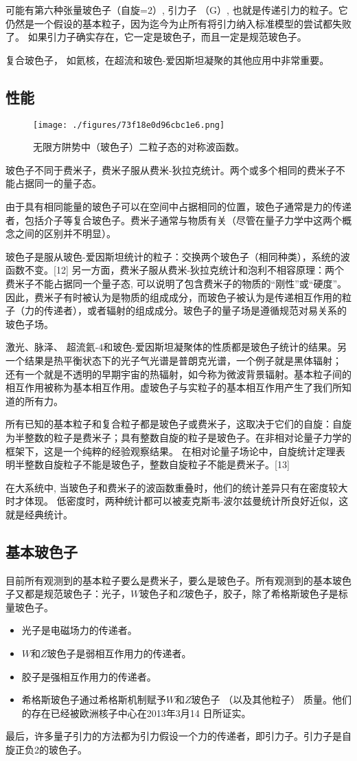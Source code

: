 可能有第六种张量玻色子（自旋=2）, 引力子 （G）, 也就是传递引力的粒子。它仍然是一个假设的基本粒子，因为迄今为止所有将引力纳入标准模型的尝试都失败了。 如果引力子确实存在，它一定是玻色子，而且一定是规范玻色子。

复合玻色子， 如氦核，在超流和玻色-爱因斯坦凝聚的其他应用中非常重要。

\subsection{性能}
\begin{figure}[ht]
\centering
\texttt{[image: ./figures/73f18e0d96cbc1e6.png]}
\caption{无限方阱势中（玻色子）二粒子态的对称波函数。} \label{fig_Boson_1}
\end{figure}
玻色子不同于费米子，费米子服从费米-狄拉克统计。两个或多个相同的费米子不能占据同一的量子态。

由于具有相同能量的玻色子可以在空间中占据相同的位置，玻色子通常是力的传递者，包括介子等复合玻色子。费米子通常与物质有关（尽管在量子力学中这两个概念之间的区别并不明显）。

玻色子是服从玻色-爱因斯坦统计的粒子：交换两个玻色子（相同种类），系统的波函数不变。[12] 另一方面，费米子服从费米-狄拉克统计和泡利不相容原理：两个费米子不能占据同一个量子态, 可以说明了包含费米子的物质的“刚性”或“硬度”。 因此，费米子有时被认为是物质的组成成分，而玻色子被认为是传递相互作用的粒子（力的传递者），或者辐射的组成成分。玻色子的量子场是遵循规范对易关系的玻色子场。

激光、脉泽、 超流氦-4和玻色-爱因斯坦凝聚体的性质都是玻色子统计的结果。另一个结果是热平衡状态下的光子气光谱是普朗克光谱，一个例子就是黑体辐射； 还有一个就是不透明的早期宇宙的热辐射，如今称为微波背景辐射。基本粒子间的相互作用被称为基本相互作用。虚玻色子与实粒子的基本相互作用产生了我们所知道的所有力。

所有已知的基本粒子和复合粒子都是玻色子或费米子，这取决于它们的自旋：自旋为半整数的粒子是费米子；具有整数自旋的粒子是玻色子。在非相对论量子力学的框架下，这是一个纯粹的经验观察结果。 在相对论量子场论中，自旋统计定理表明半整数自旋粒子不能是玻色子，整数自旋粒子不能是费米子。[13]

在大系统中, 当玻色子和费米子的波函数重叠时，他们的统计差异只有在密度较大时才体现。 低密度时，两种统计都可以被麦克斯韦-波尔兹曼统计所良好近似，这就是经典统计。

\subsection{基本玻色子}
目前所有观测到的基本粒子要么是费米子，要么是玻色子。所有观测到的基本玻色子又都是规范玻色子：光子，$W$玻色子和$Z$玻色子，胶子，除了希格斯玻色子是标量玻色子。
\begin{itemize}
\item 光子是电磁场力的传递者。
\item $W$和$Z$玻色子是弱相互作用力的传递者。
\item 胶子是强相互作用力的传递者。
\item 希格斯玻色子通过希格斯机制赋予$W$和$Z$玻色子 （以及其他粒子） 质量。他们的存在已经被欧洲核子中心在2013年3月14 日所证实。
\end{itemize}
最后，许多量子引力的方法都为引力假设一个力的传递者，即引力子。引力子是自旋正负2的玻色子。


